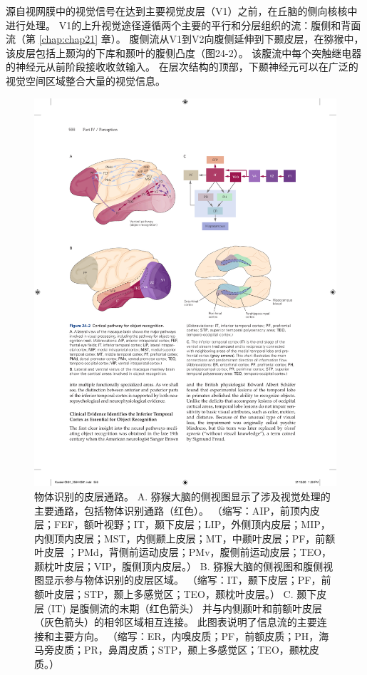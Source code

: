 源自视网膜中的视觉信号在达到主要视觉皮层（V1）之前，在丘脑的侧向核核中进行处理。
V1的上升视觉途径遵循两个主要的平行和分层组织的流：腹侧和背面流（第 \ref{chap:chap21} 章）。 
腹侧流从V1到V2向腹侧延伸到下颞皮层，在猕猴中，该皮层包括上颞沟的下库和颞叶的腹侧凸度（图24-2）。 
该腹流中每个突触继电器的神经元从前阶段接收收敛输入。 
在层次结构的顶部，下颞神经元可以在广泛的视觉空间区域整合大量的视觉信息。

\begin{figure}[htbp]
	\centering
	\includegraphics[width=0.95\linewidth]{chap24/fig_24_2}
	\caption{物体识别的皮层通路。 
		A. 猕猴大脑的侧视图显示了涉及视觉处理的主要通路，包括物体识别通路（红色）。 
		（缩写：AIP，前顶内皮层；FEF，额叶视野；IT，颞下皮层；LIP，外侧顶内皮层；MIP，内侧顶内皮层；MST，内侧颞上皮层；MT，中颞叶皮层；PF，前额叶皮层 ；PMd，背侧前运动皮层；PMv，腹侧前运动皮层；TEO，颞枕叶皮层；VIP，腹侧顶内皮层。）
		B. 猕猴大脑的侧视图和腹侧视图显示参与物体识别的皮层区域。 
		（缩写：IT，颞下皮层；PF，前额叶皮层；STP，颞上多感觉区；TEO，颞枕叶皮层。）
		C. 颞下皮层 (IT) 是腹侧流的末期（红色箭头） 并与内侧颞叶和前额叶皮层（灰色箭头）的相邻区域相互连接。 
		此图表说明了信息流的主要连接和主要方向。 
		（缩写：ER，内嗅皮质；PF，前额皮质；PH，海马旁皮质；PR，鼻周皮质；STP，颞上多感觉区；TEO，颞枕皮质。）}
	\label{fig:24_2}
\end{figure}


